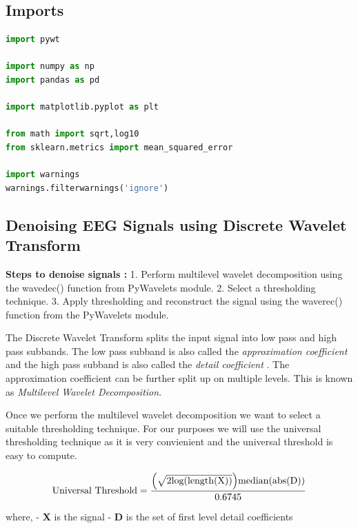 \hypertarget{imports}{%
\subsection{Imports}\label{imports}}

\begin{lstlisting}[language=Python]
import pywt

import numpy as np
import pandas as pd

import matplotlib.pyplot as plt

from math import sqrt,log10
from sklearn.metrics import mean_squared_error

import warnings
warnings.filterwarnings('ignore')
\end{lstlisting}

\hypertarget{denoising-eeg-signals-using-discrete-wavelet-transform}{%
\subsection{Denoising EEG Signals using Discrete Wavelet
Transform}\label{denoising-eeg-signals-using-discrete-wavelet-transform}}

\textbf{Steps to denoise signals :} 1. Perform multilevel wavelet
decomposition using the wavedec() function from PyWavelets module. 2.
Select a thresholding technique. 3. Apply thresholding and reconstruct
the signal using the waverec() function from the PyWavelets module.

The Discrete Wavelet Transform splits the input signal into low pass and
high pass subbands. The low pass subband is also called the
\emph{approximation coefficient} and the high pass subband is also
called the \emph{detail coefficient} . The approximation coefficient can
be further split up on multiple levels. This is known as
\emph{Multilevel Wavelet Decomposition}.

Once we perform the multilevel wavelet decomposition we want to select a
suitable thresholding technique. For our purposes we will use the
universal thresholding technique as it is very convienient and the
universal threshold is easy to compute.

\begin{equation*}
\text{Universal Threshold} = \frac{\Bigl(\sqrt{2 \text{log(length(X))}} \Bigr) \text{median(abs(D))} }{0.6745}
\end{equation*}

where, - \textbf{X} is the signal - \textbf{D} is the set of first level
detail coefficients

